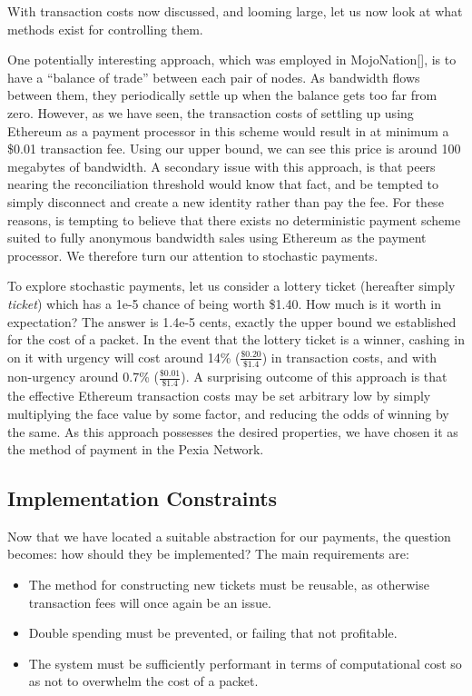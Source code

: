 \documentclass{article}
\newcommand{\mesh}{Pexia}
\begin{document}
With transaction costs now discussed, and looming large, let us now look at what methods exist for controlling them.

One potentially interesting approach, which was employed in MojoNation[\cite{mojonation}], is to have a ``balance of trade'' between each pair of nodes. As bandwidth flows between them, they periodically settle up when the balance gets too far from zero. However, as we have seen, the transaction costs of settling up using Ethereum as a payment processor in this scheme would result in at minimum a \$0.01 transaction fee. Using our upper bound, we can see this price is around 100 megabytes of bandwidth. A secondary issue with this approach, is that peers nearing the reconciliation threshold would know that fact, and be tempted to simply disconnect and create a new identity rather than pay the fee. For these reasons, is tempting to believe that there exists no deterministic payment scheme suited to fully anonymous bandwidth sales using Ethereum as the payment processor. We therefore turn our attention to stochastic payments.

To explore stochastic payments, let us consider a lottery ticket (hereafter simply \emph{ticket}) which has a 1e-5 chance of being worth \$1.40. How much is it worth in expectation? The answer is 1.4e-5 cents, exactly the upper bound we established for the cost of a packet. In the event that the lottery ticket is a winner, cashing in on it with urgency will cost around 14\% ($\frac{\$0.20}{\$1.4}$) in transaction costs, and with non-urgency around 0.7\% ($\frac{\$0.01}{\$1.4}$). A surprising outcome of this approach is that the effective Ethereum transaction costs may be set arbitrary low by simply multiplying the face value by some factor, and reducing the odds of winning by the same. As this approach possesses the desired properties, we have chosen it as the method of payment in the \mesh{} Network.

\subsection{Implementation Constraints}

Now that we have located a suitable abstraction for our payments, the question becomes: how should they be implemented? The main requirements are:

\begin{itemize}
    \item The method for constructing new tickets must be reusable, as otherwise transaction fees will once again be an issue.
    \item Double spending must be prevented, or failing that not profitable.
    \item The system must be sufficiently performant in terms of computational cost so as not to overwhelm the cost of a packet.
\end{itemize}
\end{document}
